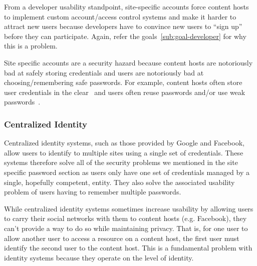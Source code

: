 \documentclass[pdftex,12pt,a4papaer]{report}
\begin{document}

From a developer usability standpoint, site-specific accounts force content
hosts to implement custom account/access control systems and make it harder to
attract new users because developers have to convince new users to ``sign up''
before they can participate. Again, refer the goals~\ref{sub:goal-developer} for
why this is a problem.


Site specific accounts are a security hazard because content hosts are
notoriously bad at safely storing credentials and users are notoriously bad at
choosing/remembering safe passwords. For example, content hosts often store user
credentials in the clear~\cite{plaintext} and users often reuse passwords and/or
use weak passwords~\cite{ms-passwords}.


\subsubsection{Centralized Identity}

Centralized identity systems, such as those provided by Google and Facebook,
allow users to identify to multiple sites using a single set of credentials.
These systems therefore solve all of the security problems we mentioned in the
site specific password section as users only have one set of credentials managed
by a single, hopefully competent, entity. They also solve the associated
usability problem of users having to remember multiple passwords.

While centralized identity systems sometimes increase usability by allowing
users to carry their social networks with them to content hosts (e.g. Facebook),
they can't provide a way to do so while maintaining privacy. That is, for one
user to allow another user to access a resource on a content host, the first
user must identify the second user to the content host. This is a fundamental
problem with identity systems because they operate on the level of identity.
\end{document}
